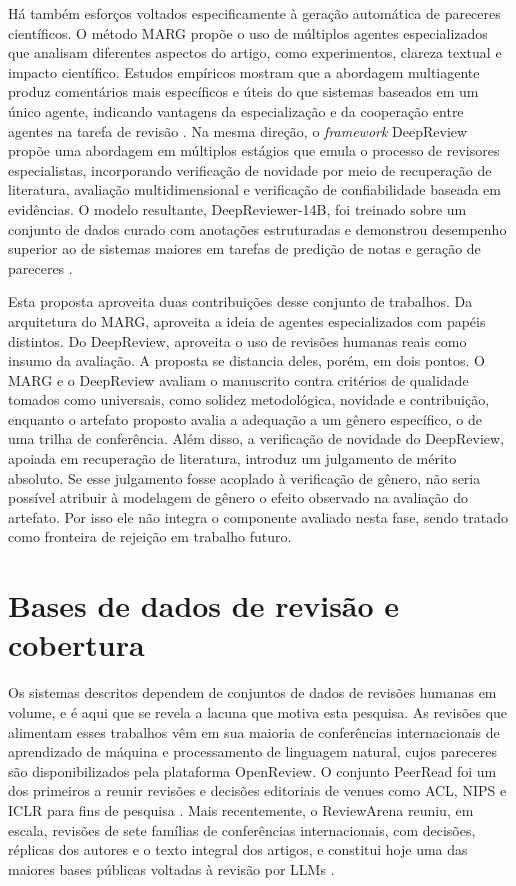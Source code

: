 Há também esforços voltados especificamente à geração automática de pareceres científicos. O método MARG  propõe o uso de múltiplos agentes especializados que analisam diferentes aspectos do artigo, como experimentos, clareza textual e impacto científico. Estudos empíricos mostram que a abordagem multiagente produz comentários mais específicos e úteis do que sistemas baseados em um único agente, indicando vantagens da especialização e da cooperação entre agentes na tarefa de revisão \cite{MARG}. Na mesma direção, o \textit{framework} DeepReview propõe uma abordagem em múltiplos estágios que emula o processo de revisores especialistas, incorporando verificação de novidade por meio de recuperação de literatura, avaliação multidimensional e verificação de confiabilidade baseada em evidências. O modelo resultante, DeepReviewer-14B, foi treinado sobre um conjunto de dados curado com anotações estruturadas e demonstrou desempenho superior ao de sistemas maiores em tarefas de predição de notas e geração de pareceres \cite{DeepReview}.

Esta proposta aproveita duas contribuições desse conjunto de trabalhos. Da arquitetura do MARG, aproveita a ideia de agentes especializados com papéis distintos. Do DeepReview, aproveita o uso de revisões humanas reais como insumo da avaliação. A proposta se distancia deles, porém, em dois pontos. O MARG e o DeepReview avaliam o manuscrito contra critérios de qualidade tomados como universais, como solidez metodológica, novidade e contribuição, enquanto o artefato proposto avalia a adequação a um gênero específico, o de uma trilha de conferência. Além disso, a verificação de novidade do DeepReview, apoiada em recuperação de literatura, introduz um julgamento de mérito absoluto. Se esse julgamento fosse acoplado à verificação de gênero, não seria possível atribuir à modelagem de gênero o efeito observado na avaliação do artefato. Por isso ele não integra o componente avaliado nesta fase, sendo tratado como fronteira de rejeição em trabalho futuro.

\section{Bases de dados de revisão e cobertura}

Os sistemas descritos dependem de conjuntos de dados de revisões humanas em volume, e é aqui que se revela a lacuna que motiva esta pesquisa. As revisões que alimentam esses trabalhos vêm em sua maioria de conferências internacionais de aprendizado de máquina e processamento de linguagem natural, cujos pareceres são disponibilizados pela plataforma OpenReview. O conjunto PeerRead foi um dos primeiros a reunir revisões e decisões editoriais de venues como ACL, NIPS e ICLR para fins de pesquisa \cite{PeerRead2018}. Mais recentemente, o ReviewArena reuniu, em escala, revisões de sete famílias de conferências internacionais, com decisões, réplicas dos autores e o texto integral dos artigos, e constitui hoje uma das maiores bases públicas voltadas à revisão por LLMs \cite{ReviewArena}.

